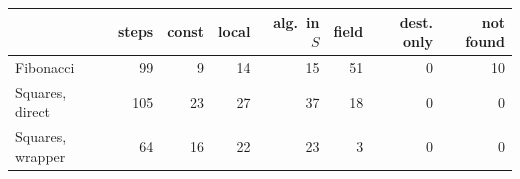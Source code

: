 \begin{tabular}{@{}lrrrrrrr@{}}\toprule & steps & const & local & alg.\ in $S$ & field & dest. only & not found\\\midrule
Fibonacci & 99 & 9 & 14 & 15 & 51 & 0 & 10\\
Squares, direct & 105 & 23 & 27 & 37 & 18 & 0 & 0\\
Squares, wrapper & 64 & 16 & 22 & 23 & 3 & 0 & 0\\
\bottomrule\end{tabular}
